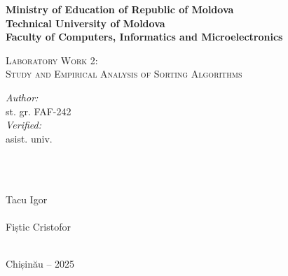 \documentclass[12pt]{article}
\begin{document}
\begin{titlepage}
  \begin{center}
    \textbf{\large Ministry of Education of Republic of Moldova}\\[0.1cm]
    \textbf{\large Technical University of Moldova}\\[0.1cm]
    \textbf{\large Faculty of Computers, Informatics and Microelectronics}\\[1.2cm]

    \vspace{40mm}

    \textsc{\Large Laboratory Work 2:}\\[0.2cm]
    \textsc{\Large Study and Empirical Analysis of Sorting Algorithms}\\[0.4cm]

    \vspace{65mm}

    \begin{minipage}[t]{0.4\textwidth}
      \begin{flushleft}\large
        \emph{Author:}\\
        st. gr. FAF-242\\[0.4cm]
        \emph{Verified:}\\
        asist. univ.
      \end{flushleft}
    \end{minipage}
    ~
    \begin{minipage}[t]{0.4\textwidth}
      \begin{flushright}\large
        \emph{}\\
        Tacu Igor\\[0.4cm]
        \emph{}\\
        Fiștic Cristofor
      \end{flushright}
    \end{minipage}\\[2cm]

    \vspace{5mm}
    \large Chișinău -- 2025

    \vfill
  \end{center}
\end{titlepage}

\clearpage
\thispagestyle{empty}
\tableofcontents

\clearpage
\setcounter{page}{2}
\pagestyle{fancy}
\fancyhf{}
\rhead{\thepage}
\end{document}
